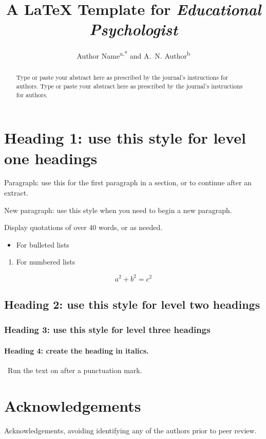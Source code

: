 \documentclass{tandf}
\title{A \LaTeX{} Template for \textit{Educational Psychologist}}
\author{Author Name\textsuperscript{a,*} and A.~N. Author\textsuperscript{b}}
\affiliation{\textsuperscript{a}Department, University, City, Country; \textsuperscript{b}Department, University, City, Country}
\begin{document}
\maketitle
\begin{abstract}
Type or paste your abstract here as prescribed by the journal's instructions for authors. Type or paste your abstract here as prescribed by the journal's instructions for authors.
\end{abstract}
\section{Heading 1: use this style for level one headings}
Paragraph: use this for the first paragraph in a section, or to continue after an extract.

New paragraph: use this style when you need to begin a new paragraph.

Display quotations of over 40 words, or as needed.
\begin{itemize}
  \item For bulleted lists
\end{itemize}
\begin{enumerate}
  \item For numbered lists
\end{enumerate}
\begin{equation}
  a^2 + b^2 = c^2
\end{equation}
\subsection{Heading 2: use this style for level two headings}
\subsubsection{Heading 3: use this style for level three headings}
\paragraph{Heading 4: create the heading in italics.}\ Run the text on after a punctuation mark.
\section{Acknowledgements}
Acknowledgements, avoiding identifying any of the authors prior to peer review.

\nocite{example2026}

\end{document}
